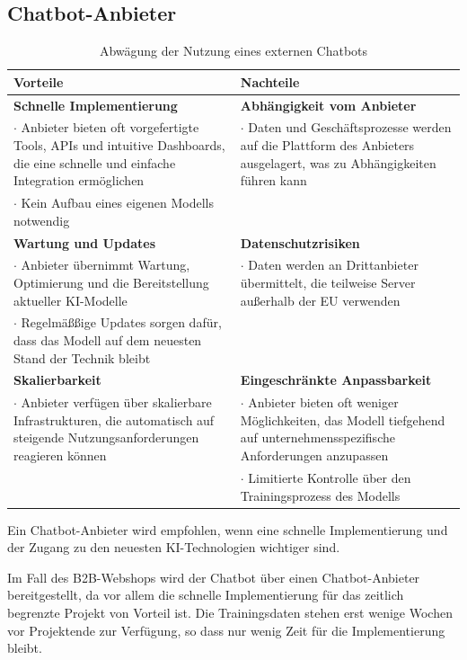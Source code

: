\documentclass[%
	12pt,
	a4paper,
	oneside,
	parskip=full
]{scrbook}
\begin{document}
\subsection{Chatbot-Anbieter}
\begin{table}[ht]
	\centering
	\begin{tabularx}{\textwidth}{X|X}
		Vorteile & Nachteile \\ \hline \hline
		\textbf{Schnelle Implementierung} & \textbf{Abhängigkeit vom Anbieter} \\
		$\cdot$ Anbieter bieten oft vorgefertigte Tools, APIs und intuitive Dashboards, die eine schnelle und einfache Integration ermöglichen & $\cdot$ Daten und Geschäftsprozesse werden auf die Plattform des Anbieters ausgelagert, was zu Abhängigkeiten führen kann\\
		$\cdot$ Kein Aufbau eines eigenen Modells notwendig & \times  \\ \hline
		\textbf{Wartung und Updates} & \textbf{Datenschutzrisiken} \\
		$\cdot$ Anbieter übernimmt Wartung, Optimierung und die Bereitstellung aktueller KI-Modelle & $\cdot$ Daten werden an Drittanbieter übermittelt, die teilweise Server außerhalb der EU verwenden \\
		$\cdot$ Regelmäßßige Updates sorgen dafür, dass das Modell auf dem neuesten Stand der Technik bleibt & \times \\ \hline
		\textbf{Skalierbarkeit} & \textbf{Eingeschränkte Anpassbarkeit}\\
		$\cdot$ Anbieter verfügen über skalierbare Infrastrukturen, die automatisch auf steigende Nutzungsanforderungen reagieren können & $\cdot$ Anbieter bieten oft weniger Möglichkeiten, das Modell tiefgehend auf unternehmensspezifische Anforderungen anzupassen\\
		\times & $\cdot$ Limitierte Kontrolle über den Trainingsprozess des Modells\\
	\end{tabularx} 
	\caption{Abwägung der Nutzung eines externen Chatbots}
\end{table}
Ein Chatbot-Anbieter wird empfohlen, wenn eine schnelle Implementierung und der Zugang zu den neuesten KI-Technologien wichtiger sind.

Im Fall des B2B-Webshops wird der Chatbot über einen Chatbot-Anbieter bereitgestellt, da vor allem die schnelle Implementierung für das zeitlich begrenzte Projekt von Vorteil ist. 
Die Trainingsdaten stehen erst wenige Wochen vor Projektende zur Verfügung, so dass nur wenig Zeit für die Implementierung bleibt.
\end{document}
